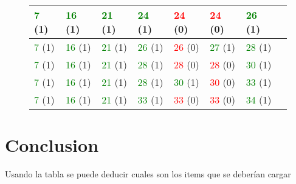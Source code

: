 \documentclass{article}
\begin{document}
\begin{figure}[H]
\begin{tabular}{|l|l|l|l|l|l|l|l|}
\textcolor{green}{7} (1)&\textcolor{green}{16} (1)&\textcolor{green}{21} (1)&\textcolor{green}{24} (1)&\textcolor{red}{24} (0)&\textcolor{red}{24} (0)&\textcolor{green}{26} (1)&\\ \hline
\textcolor{green}{7} (1)&\textcolor{green}{16} (1)&\textcolor{green}{21} (1)&\textcolor{green}{26} (1)&\textcolor{red}{26} (0)&\textcolor{green}{27} (1)&\textcolor{green}{28} (1)&\\ \hline
\textcolor{green}{7} (1)&\textcolor{green}{16} (1)&\textcolor{green}{21} (1)&\textcolor{green}{28} (1)&\textcolor{red}{28} (0)&\textcolor{red}{28} (0)&\textcolor{green}{30} (1)&\\ \hline
\textcolor{green}{7} (1)&\textcolor{green}{16} (1)&\textcolor{green}{21} (1)&\textcolor{green}{28} (1)&\textcolor{green}{30} (1)&\textcolor{red}{30} (0)&\textcolor{green}{33} (1)&\\ \hline
\textcolor{green}{7} (1)&\textcolor{green}{16} (1)&\textcolor{green}{21} (1)&\textcolor{green}{33} (1)&\textcolor{red}{33} (0)&\textcolor{red}{33} (0)&\textcolor{green}{34} (1)&\\ \hline
\end{tabular}
\end{figure}


\section{Conclusion}
Usando la tabla se puede deducir cuales son los items que se deberían cargar
\end{document}
